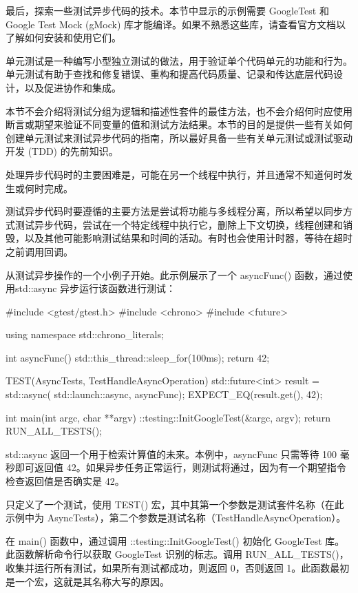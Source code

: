 
最后，探索一些测试异步代码的技术。本节中显示的示例需要 GoogleTest 和 Google Test Mock (gMock) 库才能编译。如果不熟悉这些库，请查看官方文档以了解如何安装和使用它们。

单元测试是一种编写小型独立测试的做法，用于验证单个代码单元的功能和行为。单元测试有助于查找和修复错误、重构和提高代码质量、记录和传达底层代码设计，以及促进协作和集成。

本节不会介绍将测试分组为逻辑和描述性套件的最佳方法，也不会介绍何时应使用断言或期望来验证不同变量的值和测试方法结果。本节的目的是提供一些有关如何创建单元测试来测试异步代码的指南，所以最好具备一些有关单元测试或测试驱动开发 (TDD) 的先前知识。

处理异步代码时的主要困难是，可能在另一个线程中执行，并且通常不知道何时发生或何时完成。

测试异步代码时要遵循的主要方法是尝试将功能与多线程分离，所以希望以同步方式测试异步代码，尝试在一个特定线程中执行它，删除上下文切换，线程创建和销毁，以及其他可能影响测试结果和时间的活动。有时也会使用计时器，等待在超时之前调用回调。


从测试异步操作的一个小例子开始。此示例展示了一个 asyncFunc() 函数，通过使用std::async 异步运行该函数进行测试：

\begin{cpp}
#include <gtest/gtest.h>
#include <chrono>
#include <future>

using namespace std::chrono_literals;

int asyncFunc() {
    std::this_thread::sleep_for(100ms);
    return 42;
}

TEST(AsyncTests, TestHandleAsyncOperation) {
    std::future<int> result = std::async(
                            std::launch::async,
                            asyncFunc);
    EXPECT_EQ(result.get(), 42);
}


int main(int argc, char **argv) {
    ::testing::InitGoogleTest(&argc, argv);
    return RUN_ALL_TESTS();
}
\end{cpp}

std::async 返回一个用于检索计算值的未来。本例中，asyncFunc 只需等待 100 毫秒即可返回值 42。如果异步任务正常运行，则测试将通过，因为有一个期望指令检查返回值是否确实是 42。

只定义了一个测试，使用 TEST() 宏，其中其第一个参数是测试套件名称（在此示例中为 AsyncTests），第二个参数是测试名称（TestHandleAsyncOperation）。

在 main() 函数中，通过调用 ::testing::InitGoogleTest() 初始化 GoogleTest 库。此函数解析命令行以获取 GoogleTest 识别的标志。调用 RUN\_ALL\_TESTS()，收集并运行所有测试，如果所有测试都成功，则返回 0，否则返回 1。此函数最初是一个宏，这就是其名称大写的原因。

